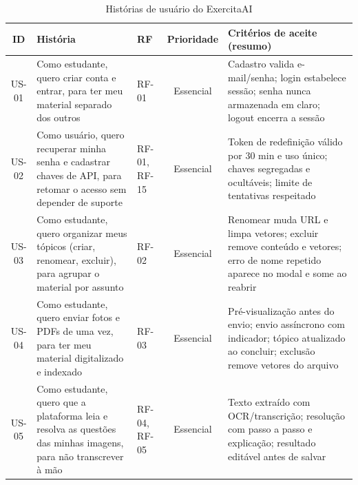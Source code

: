 \begin{table}[H]
\centering
\setlength{\tabcolsep}{2.5pt}
\caption{Histórias de usuário do ExercitaAI}
\label{tab:req-historias}
\begin{tabularx}{\textwidth}{|C|Y|L{1.5cm}|C|Y|}
\hline
\textbf{ID} & \textbf{História} & \textbf{RF} & \textbf{Prioridade} & \textbf{Critérios de aceite (resumo)} \\
\hline
US-01 & Como estudante, quero criar conta e entrar, para ter meu material separado dos outros & RF-01 & Essencial & Cadastro valida e-mail/senha; login estabelece sessão; senha nunca armazenada em claro; logout encerra a sessão \\
\hline
US-02 & Como usuário, quero recuperar minha senha e cadastrar chaves de API, para retomar o acesso sem depender de suporte & RF-01, RF-15 & Essencial & Token de redefinição válido por 30 min e uso único; chaves segregadas e ocultáveis; limite de tentativas respeitado \\
\hline
US-03 & Como estudante, quero organizar meus tópicos (criar, renomear, excluir), para agrupar o material por assunto & RF-02 & Essencial & Renomear muda URL e limpa vetores; excluir remove conteúdo e vetores; erro de nome repetido aparece no modal e some ao reabrir \\
\hline
US-04 & Como estudante, quero enviar fotos e PDFs de uma vez, para ter meu material digitalizado e indexado & RF-03 & Essencial & Pré-visualização antes do envio; envio assíncrono com indicador; tópico atualizado ao concluir; exclusão remove vetores do arquivo \\
\hline
US-05 & Como estudante, quero que a plataforma leia e resolva as questões das minhas imagens, para não transcrever à mão & RF-04, RF-05 & Essencial & Texto extraído com OCR/transcrição; resolução com passo a passo e explicação; resultado editável antes de salvar \\
\hline
\end{tabularx}
\end{table}

